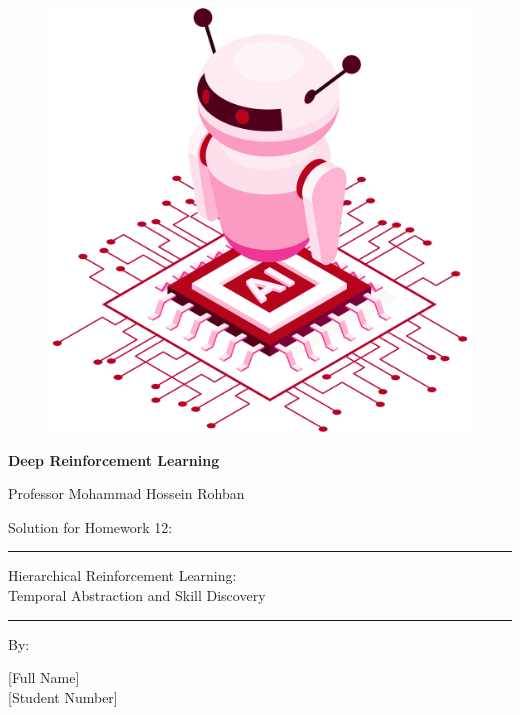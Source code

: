 \documentclass[12pt]{article}
\begin{document}
\thispagestyle{plain}

\begin{center}

\vspace*{-1.5cm}
\begin{figure}[!h]
    \centering
    \includegraphics[width=0.7\linewidth]{figs/cover-std.png}
\end{figure}

{

{\color{DarkBlue} {\fontsize{30}{50} \textbf{
Deep Reinforcement Learning
}}}

{\color{DarkBlue} {\Large
Professor Mohammad Hossein Rohban
}}
}


\vspace{20pt}

{


{\color{RedOrange}
{\Large
Solution for Homework 12:
}\\
}
{\color{BrickRed}
\rule{12cm}{0.5pt}

{\Huge

Hierarchical Reinforcement Learning:\\
Temporal Abstraction and Skill Discovery

}
\rule{12cm}{0.5pt}
}

\vspace{10pt}

{\color{RoyalPurple} { \small By:} } \\
\vspace{10pt}

{\color{Blue} { \LARGE [Full Name] } } \\
\vspace{5pt}
{\color{RoyalBlue} { \Large [Student Number] } }


}
\end{center}
\end{document}
